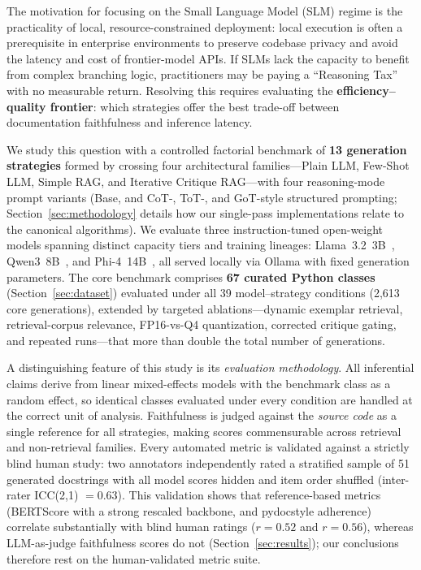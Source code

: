 \documentclass[pdflatex,sn-mathphys-ay]{sn-jnl}%
\theoremstyle{thmstyleone}%
\theoremstyle{thmstyletwo}%
\theoremstyle{thmstylethree}%
\begin{document}
The motivation for focusing on the Small Language Model (SLM) regime is the practicality of local, resource-constrained deployment: local execution is often a prerequisite in enterprise environments to preserve codebase privacy and avoid the latency and cost of frontier-model APIs. If SLMs lack the capacity to benefit from complex branching logic, practitioners may be paying a ``Reasoning Tax'' with no measurable return. Resolving this requires evaluating the \textbf{efficiency--quality frontier}: which strategies offer the best trade-off between documentation faithfulness and inference latency.

We study this question with a controlled factorial benchmark of \textbf{13 generation strategies} formed by crossing four architectural families---Plain LLM, Few-Shot LLM, Simple RAG, and Iterative Critique RAG---with four reasoning-mode prompt variants (Base, and CoT-, ToT-, and GoT-style structured prompting; Section~\ref{sec:methodology} details how our single-pass implementations relate to the canonical algorithms). We evaluate three instruction-tuned open-weight models spanning distinct capacity tiers and training lineages: Llama~3.2~3B~\cite{grattafiori2024llama3herdmodels}, Qwen3~8B~\cite{yang2025qwen3technicalreport}, and Phi-4~14B~\cite{abdin2024phi4technicalreport}, all served locally via Ollama with fixed generation parameters. The core benchmark comprises \textbf{67 curated Python classes} (Section~\ref{sec:dataset}) evaluated under all 39 model--strategy conditions (2,613 core generations), extended by targeted ablations---dynamic exemplar retrieval, retrieval-corpus relevance, FP16-vs-Q4 quantization, corrected critique gating, and repeated runs---that more than double the total number of generations.

A distinguishing feature of this study is its \emph{evaluation methodology}. All inferential claims derive from linear mixed-effects models with the benchmark class as a random effect, so identical classes evaluated under every condition are handled at the correct unit of analysis. Faithfulness is judged against the \emph{source code} as a single reference for all strategies, making scores commensurable across retrieval and non-retrieval families. Every automated metric is validated against a strictly blind human study: two annotators independently rated a stratified sample of 51 generated docstrings with all model scores hidden and item order shuffled (inter-rater ICC(2,1) $=0.63$). This validation shows that reference-based metrics (BERTScore with a strong rescaled backbone, and pydocstyle adherence) correlate substantially with blind human ratings ($r=0.52$ and $r=0.56$), whereas LLM-as-judge faithfulness scores do not (Section~\ref{sec:results}); our conclusions therefore rest on the human-validated metric suite.
\end{document}

